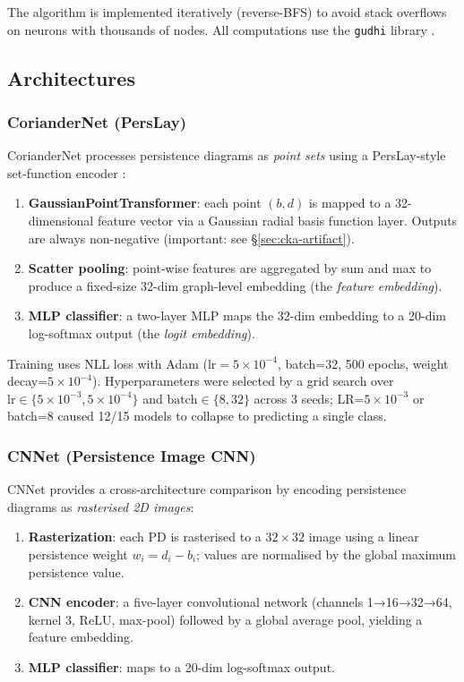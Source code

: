The algorithm is implemented iteratively (reverse-BFS) to avoid stack overflows on
neurons with thousands of nodes.  All computations use the \texttt{gudhi} library
\citep{gudhi:urm}.

\subsection{Architectures}

\subsubsection{CorianderNet (PersLay)}

CorianderNet processes persistence diagrams as \emph{point sets} using a
PersLay-style set-function encoder \citep{carriere2020perslay}:

\begin{enumerate}
  \item \textbf{GaussianPointTransformer}: each point $(b, d)$ is mapped to a
        32-dimensional feature vector via a Gaussian radial basis function layer.
        Outputs are always non-negative (important: see \S\ref{sec:cka-artifact}).
  \item \textbf{Scatter pooling}: point-wise features are aggregated by sum and max
        to produce a fixed-size 32-dim graph-level embedding (the \emph{feature embedding}).
  \item \textbf{MLP classifier}: a two-layer MLP maps the 32-dim embedding to a
        20-dim log-softmax output (the \emph{logit embedding}).
\end{enumerate}

Training uses NLL loss with Adam ($\text{lr}=5 \times 10^{-4}$, batch=32, 500 epochs,
weight decay=$5\times10^{-4}$).  Hyperparameters were selected by a grid search
over $\text{lr} \in \{5\times10^{-3}, 5\times10^{-4}\}$ and
$\text{batch} \in \{8, 32\}$ across 3 seeds; LR=$5\times10^{-3}$ or batch=8 caused
12/15 models to collapse to predicting a single class.

\subsubsection{CNNet (Persistence Image CNN)}

CNNet provides a cross-architecture comparison by encoding persistence diagrams
as \emph{rasterised 2D images}:

\begin{enumerate}
  \item \textbf{Rasterization}: each PD is rasterised to a $32 \times 32$ image
        using a linear persistence weight $w_i = d_i - b_i$; values are normalised
        by the global maximum persistence value.
  \item \textbf{CNN encoder}: a five-layer convolutional network (channels 1→16→32→64,
        kernel 3, ReLU, max-pool) followed by a global average pool, yielding a
        feature embedding.
  \item \textbf{MLP classifier}: maps to a 20-dim log-softmax output.
\end{enumerate}

